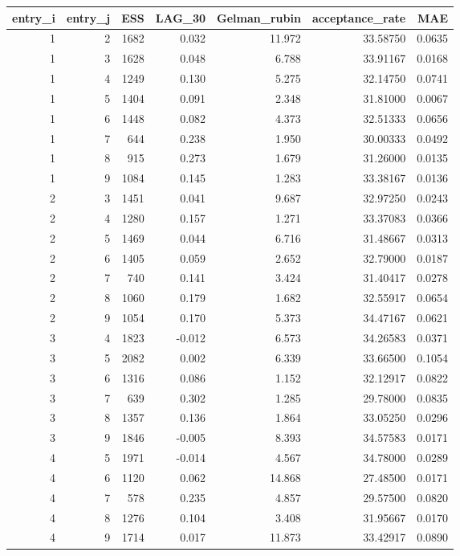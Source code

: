 \begin{longtable}{rrrrrrr}
\toprule
entry\_i & entry\_j & ESS & LAG\_30 & Gelman\_rubin & acceptance\_rate & MAE \\ 
\midrule
1 & 2 & 1682 & 0.032 & 11.972 & 33.58750 & 0.0635 \\ 
1 & 3 & 1628 & 0.048 & 6.788 & 33.91167 & 0.0168 \\ 
1 & 4 & 1249 & 0.130 & 5.275 & 32.14750 & 0.0741 \\ 
1 & 5 & 1404 & 0.091 & 2.348 & 31.81000 & 0.0067 \\ 
1 & 6 & 1448 & 0.082 & 4.373 & 32.51333 & 0.0656 \\ 
1 & 7 & 644 & 0.238 & 1.950 & 30.00333 & 0.0492 \\ 
1 & 8 & 915 & 0.273 & 1.679 & 31.26000 & 0.0135 \\ 
1 & 9 & 1084 & 0.145 & 1.283 & 33.38167 & 0.0136 \\ 
2 & 3 & 1451 & 0.041 & 9.687 & 32.97250 & 0.0243 \\ 
2 & 4 & 1280 & 0.157 & 1.271 & 33.37083 & 0.0366 \\ 
2 & 5 & 1469 & 0.044 & 6.716 & 31.48667 & 0.0313 \\ 
2 & 6 & 1405 & 0.059 & 2.652 & 32.79000 & 0.0187 \\ 
2 & 7 & 740 & 0.141 & 3.424 & 31.40417 & 0.0278 \\ 
2 & 8 & 1060 & 0.179 & 1.682 & 32.55917 & 0.0654 \\ 
2 & 9 & 1054 & 0.170 & 5.373 & 34.47167 & 0.0621 \\ 
3 & 4 & 1823 & -0.012 & 6.573 & 34.26583 & 0.0371 \\ 
3 & 5 & 2082 & 0.002 & 6.339 & 33.66500 & 0.1054 \\ 
3 & 6 & 1316 & 0.086 & 1.152 & 32.12917 & 0.0822 \\ 
3 & 7 & 639 & 0.302 & 1.285 & 29.78000 & 0.0835 \\ 
3 & 8 & 1357 & 0.136 & 1.864 & 33.05250 & 0.0296 \\ 
3 & 9 & 1846 & -0.005 & 8.393 & 34.57583 & 0.0171 \\ 
4 & 5 & 1971 & -0.014 & 4.567 & 34.78000 & 0.0289 \\ 
4 & 6 & 1120 & 0.062 & 14.868 & 27.48500 & 0.0171 \\ 
4 & 7 & 578 & 0.235 & 4.857 & 29.57500 & 0.0820 \\ 
4 & 8 & 1276 & 0.104 & 3.408 & 31.95667 & 0.0170 \\ 
4 & 9 & 1714 & 0.017 & 11.873 & 33.42917 & 0.0890 \\ 

\end{longtable}
